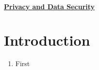 \documentclass{report}
\begin{document}
 \begin{center}
 \huge{\textbf{\underline{Privacy and Data Security}}}
 \end{center}
 
 {\let\clearpage\relax \chapter{Introduction}}
 \begin{enumerate}[-]
 	\item First
 \end{enumerate}
 
\end{document}
